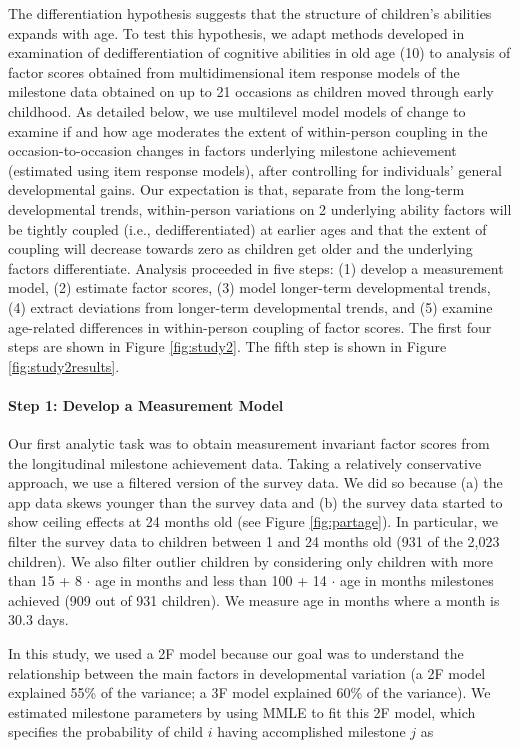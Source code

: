 \documentclass[man, floatsintext]{apa7}
\begin{document}
The differentiation hypothesis suggests that the structure of children's
abilities expands with age. To test this hypothesis, we adapt methods developed in
examination of dedifferentiation of cognitive abilities in old age (10)
to analysis of factor scores obtained from multidimensional item
response models of the milestone data obtained on up to 21 occasions as
children moved through early childhood. As detailed below, we use
multilevel model models of change to examine if and how age moderates
the extent of within-person coupling in the occasion-to-occasion changes
in factors underlying milestone achievement (estimated using item
response models), after controlling for individuals' general
developmental gains. Our expectation is that, separate from the
long-term developmental trends, within-person variations on 2 underlying
ability factors will be tightly coupled (i.e., dedifferentiated) at
earlier ages and that the extent of coupling will decrease towards zero
as children get older and the underlying factors differentiate. Analysis
proceeded in five steps: (1) develop a measurement model, (2) estimate
factor scores, (3) model longer-term developmental trends, (4) extract
deviations from longer-term developmental trends, and (5) examine
age-related differences in within-person coupling of factor scores. The
first four steps are shown in Figure \ref{fig:study2}. The fifth step is
shown in Figure \ref{fig:study2results}.

\paragraph{Step 1: Develop a Measurement
Model}
Our first analytic task was to obtain measurement invariant factor
scores from the longitudinal milestone achievement data. Taking a
relatively conservative approach, we use a filtered version of the
survey data. We did so because (a) the app data skews younger than the
survey data and (b) the survey data started to show ceiling effects at
24 months old (see Figure \ref{fig:partage}). In particular, we filter
the survey data to children between 1 and 24 months old (931 of the
2,023 children). We also filter outlier children by considering only
children with more than 15 + 8 $\cdot$ age in months and less
than 100 + 14 $\cdot$ age in months milestones achieved (909
out of 931 children). We measure age in months where a month is 30.3
days. 

In this study, we used a 2F model because our goal was to understand the
relationship between the main factors in developmental variation (a 2F model explained 55\% of the
variance; a 3F model explained 60\% of the variance). We estimated
milestone parameters by using MMLE to fit this 2F model, which specifies
the probability of child $i$ having accomplished milestone $j$ as
\end{document}
